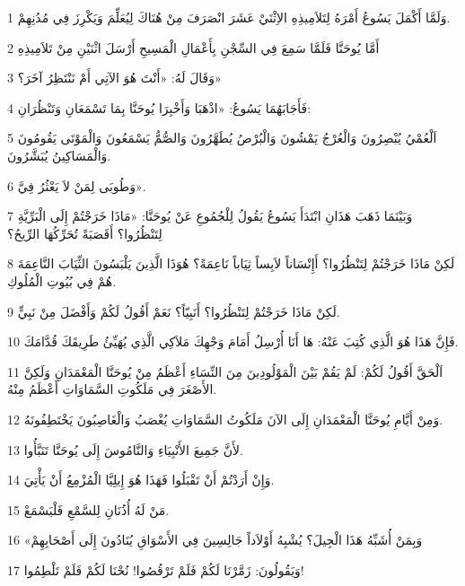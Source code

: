 \par 1 وَلَمَّا أَكْمَلَ يَسُوعُ أَمْرَهُ لِتَلاَمِيذِهِ الاِثْنَيْ عَشَرَ انْصَرَفَ مِنْ هُنَاكَ لِيُعَلِّمَ وَيَكْرِزَ فِي مُدُنِهِمْ.
\par 2 أَمَّا يُوحَنَّا فَلَمَّا سَمِعَ فِي السِّجْنِ بِأَعْمَالِ الْمَسِيحِ أَرْسَلَ اثْنَيْنِ مِنْ تَلاَمِيذِهِ
\par 3 وَقَالَ لَهُ: «أَنْتَ هُوَ الآتِي أَمْ نَنْتَظِرُ آخَرَ؟»
\par 4 فَأَجَابَهُمَا يَسُوعُ: «اذْهَبَا وَأَخْبِرَا يُوحَنَّا بِمَا تَسْمَعَانِ وَتَنْظُرَانِ:
\par 5 اَلْعُمْيُ يُبْصِرُونَ وَالْعُرْجُ يَمْشُونَ وَالْبُرْصُ يُطَهَّرُونَ وَالصُّمُّ يَسْمَعُونَ وَالْمَوْتَى يَقُومُونَ وَالْمَسَاكِينُ يُبَشَّرُونَ.
\par 6 وَطُوبَى لِمَنْ لاَ يَعْثُرُ فِيَّ».
\par 7 وَبَيْنَمَا ذَهَبَ هَذَانِ ابْتَدَأَ يَسُوعُ يَقُولُ لِلْجُمُوعِ عَنْ يُوحَنَّا: «مَاذَا خَرَجْتُمْ إِلَى الْبَرِّيَّةِ لِتَنْظُرُوا؟ أَقَصَبَةً تُحَرِّكُهَا الرِّيحُ؟
\par 8 لَكِنْ مَاذَا خَرَجْتُمْ لِتَنْظُرُوا؟ أَإِنْسَاناً لاَبِساً ثِيَاباً نَاعِمَةً؟ هُوَذَا الَّذِينَ يَلْبَسُونَ الثِّيَابَ النَّاعِمَةَ هُمْ فِي بُيُوتِ الْمُلُوكِ.
\par 9 لَكِنْ مَاذَا خَرَجْتُمْ لِتَنْظُرُوا؟ أَنَبِيّاً؟ نَعَمْ أَقُولُ لَكُمْ وَأَفْضَلَ مِنْ نَبِيٍّ.
\par 10 فَإِنَّ هَذَا هُوَ الَّذِي كُتِبَ عَنْهُ: هَا أَنَا أُرْسِلُ أَمَامَ وَجْهِكَ مَلاَكِي الَّذِي يُهَيِّئُ طَرِيقَكَ قُدَّامَكَ.
\par 11 اَلْحَقَّ أَقُولُ لَكُمْ: لَمْ يَقُمْ بَيْنَ الْمَوْلُودِينَ مِنَ النِّسَاءِ أَعْظَمُ مِنْ يُوحَنَّا الْمَعْمَدَانِ وَلَكِنَّ الأَصْغَرَ فِي مَلَكُوتِ السَّمَاوَاتِ أَعْظَمُ مِنْهُ.
\par 12 وَمِنْ أَيَّامِ يُوحَنَّا الْمَعْمَدَانِ إِلَى الآنَ مَلَكُوتُ السَّمَاوَاتِ يُغْصَبُ وَالْغَاصِبُونَ يَخْتَطِفُونَهُ.
\par 13 لأَنَّ جَمِيعَ الأَنْبِيَاءِ وَالنَّامُوسَ إِلَى يُوحَنَّا تَنَبَّأُوا.
\par 14 وَإِنْ أَرَدْتُمْ أَنْ تَقْبَلُوا فَهَذَا هُوَ إِيلِيَّا الْمُزْمِعُ أَنْ يَأْتِيَ.
\par 15 مَنْ لَهُ أُذُنَانِ لِلسَّمْعِ فَلْيَسْمَعْ.
\par 16 «وَبِمَنْ أُشَبِّهُ هَذَا الْجِيلَ؟ يُشْبِهُ أَوْلاَداً جَالِسِينَ فِي الأَسْوَاقِ يُنَادُونَ إِلَى أَصْحَابِهِمْ
\par 17 وَيَقُولُونَ: زَمَّرْنَا لَكُمْ فَلَمْ تَرْقُصُوا! نُحْنَا لَكُمْ فَلَمْ تَلْطِمُوا!
